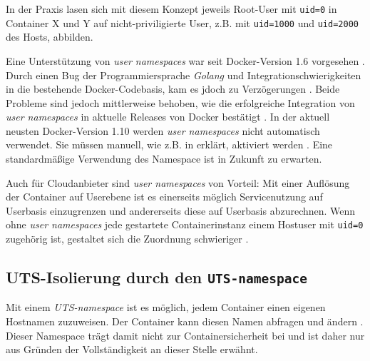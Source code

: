 \documentclass[../main.tex]{subfiles}
\begin{document}
			In der Praxis lasen sich mit diesem Konzept jeweils Root-User mit \texttt{uid=0} in Container X und Y auf nicht-priviligierte User, z.B. mit \texttt{uid=1000} und \texttt{uid=2000} des Hosts, abbilden.

			Eine Unterstützung von \emph{user namespaces} war seit Docker-Version 1.6 vorgesehen \cite{githubUserNamespaceProposal}. Durch einen Bug der Programmiersprache \emph{Golang} und Integrationschwierigkeiten in die bestehende Docker-Codebasis, kam es jdoch zu Verzögerungen \cite{nsUserGolangBug}\cite{githubUserNamespaceConflict}\cite{githubUserNamespaceIntegration}. Beide Probleme sind jedoch mittlerweise behoben, wie die erfolgreiche Integration von \emph{user namespaces} in aktuelle Releases von Docker bestätigt \cite{githubUserNamespaceIntegration}. In der aktuell neusten Docker-Version 1.10 werden \emph{user namespaces} nicht automatisch verwendet. Sie müssen manuell, wie z.B. in \cite{nsUserEnable} erklärt, aktiviert werden \cite{githubDockerChangelog}. Eine standardmäßige Verwendung des Namespace ist in Zukunft zu erwarten.





			Auch für Cloudanbieter sind \emph{user namespaces} von Vorteil: Mit einer Auflösung der Container auf Userebene ist es einerseits möglich Servicenutzung auf Userbasis einzugrenzen und andererseits diese auf Userbasis abzurechnen. Wenn ohne \emph{user namespaces} jede gestartete Containerinstanz einem Hostuser mit \texttt{uid=0} zugehörig ist, gestaltet sich die Zuordnung schwieriger \cite[S.3]{nsUserContainerCon}.

		\subsection{\acrshort{UTS}-Isolierung durch den \texttt{\acrshort{UTS}-namespace}}
			Mit einem \emph{\acrshort{UTS}-namespace} ist es möglich, jedem Container einen eigenen Hostnamen zuzuweisen. Der Container kann diesen Namen abfragen und ändern \cite[S.3]{virtVSContainer}. Dieser Namespace trägt damit nicht zur Containersicherheit bei und ist daher nur aus Gründen der Vollständigkeit an dieser Stelle erwähnt.
\end{document}
